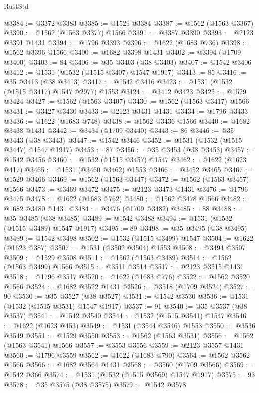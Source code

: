 \begin{lexlean}{RustStd}
\begin{coremodule}
@3384 := @3372 @3383
@3385 := @1529 @3384
@3387 := @1562 (@1563 @3367)
@3390 := @1562 (@1563 @3377) @1566
@3391 := @3387 @3390
@3393 := @2123 @3391 @1431
@3394 := @1796 @3393
@3396 := @1622 (@1683 @736)
@3398 := @1562 @3396 @1566
@3400 := @1682 @3398 @1431
@3402 := @3394 (@1709 @3400)
@3403 := 84
@3406 := @35 @3403 (@38 @3403)
@3407 := @1542 @3406
@3412 := @1531 (@1532 (@1515 @3407) @1547 @1917)
@3413 := 85
@3416 := @35 @3413 (@38 @3413)
@3417 := @1542 @3416
@3423 := @1531 (@1532 (@1515 @3417) @1547 @2977) @1553
@3424 := @3412 @3423
@3425 := @1529 @3424
@3427 := @1562 (@1563 @3407)
@3430 := @1562 (@1563 @3417) @1566
@3431 := @3427 @3430
@3433 := @2123 @3431 @1431
@3434 := @1796 @3433
@3436 := @1622 (@1683 @748)
@3438 := @1562 @3436 @1566
@3440 := @1682 @3438 @1431
@3442 := @3434 (@1709 @3440)
@3443 := 86
@3446 := @35 @3443 (@38 @3443)
@3447 := @1542 @3446
@3452 := @1531 (@1532 (@1515 @3447) @1547 @1917)
@3453 := 87
@3456 := @35 @3453 (@38 @3453)
@3457 := @1542 @3456
@3460 := @1532 (@1515 @3457) @1547
@3462 := @1622 (@1623 @417)
@3465 := @1531 (@3460 @3462) @1553
@3466 := @3452 @3465
@3467 := @1529 @3466
@3469 := @1562 (@1563 @3447)
@3472 := @1562 (@1563 @3457) @1566
@3473 := @3469 @3472
@3475 := @2123 @3473 @1431
@3476 := @1796 @3475
@3478 := @1622 (@1683 @762)
@3480 := @1562 @3478 @1566
@3482 := @1682 @3480 @1431
@3484 := @3476 (@1709 @3482)
@3485 := 88
@3488 := @35 @3485 (@38 @3485)
@3489 := @1542 @3488
@3494 := @1531 (@1532 (@1515 @3489) @1547 @1917)
@3495 := 89
@3498 := @35 @3495 (@38 @3495)
@3499 := @1542 @3498
@3502 := @1532 (@1515 @3499) @1547
@3504 := @1622 (@1623 @387)
@3507 := @1531 (@3502 @3504) @1553
@3508 := @3494 @3507
@3509 := @1529 @3508
@3511 := @1562 (@1563 @3489)
@3514 := @1562 (@1563 @3499) @1566
@3515 := @3511 @3514
@3517 := @2123 @3515 @1431
@3518 := @1796 @3517
@3520 := @1622 (@1683 @776)
@3522 := @1562 @3520 @1566
@3524 := @1682 @3522 @1431
@3526 := @3518 (@1709 @3524)
@3527 := 90
@3530 := @35 @3527 (@38 @3527)
@3531 := @1542 @3530
@3536 := @1531 (@1532 (@1515 @3531) @1547 @1917)
@3537 := 91
@3540 := @35 @3537 (@38 @3537)
@3541 := @1542 @3540
@3544 := @1532 (@1515 @3541) @1547
@3546 := @1622 (@1623 @453)
@3549 := @1531 (@3544 @3546) @1553
@3550 := @3536 @3549
@3551 := @1529 @3550
@3553 := @1562 (@1563 @3531)
@3556 := @1562 (@1563 @3541) @1566
@3557 := @3553 @3556
@3559 := @2123 @3557 @1431
@3560 := @1796 @3559
@3562 := @1622 (@1683 @790)
@3564 := @1562 @3562 @1566
@3566 := @1682 @3564 @1431
@3568 := @3560 (@1709 @3566)
@3569 := @1542 @366
@3574 := @1531 (@1532 (@1515 @3569) @1547 @1917)
@3575 := 93
@3578 := @35 @3575 (@38 @3575)
@3579 := @1542 @3578

\end{coremodule}
\end{lexlean}
